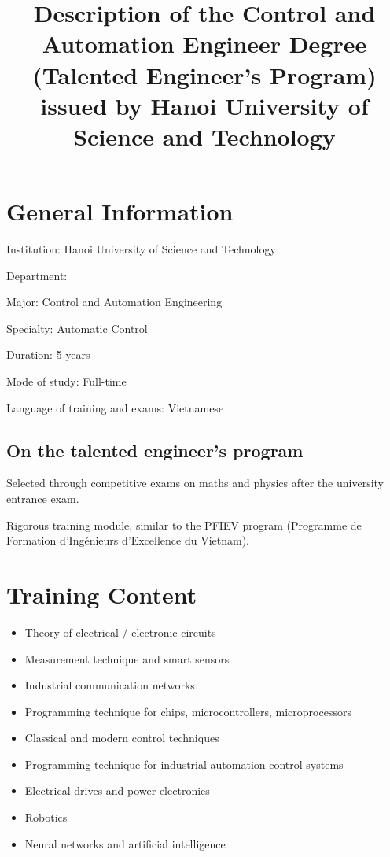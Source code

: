 \documentclass[11p]{article}
\title{Description of the Control and Automation Engineer Degree (Talented Engineer's Program)\\issued by Hanoi University of Science and Technology}
\author{}
\date{}
\theoremstyle{problemstyle}
\begin{document}
\maketitle

\section{General Information}

Institution: Hanoi University of Science and Technology

Department: 

Major: Control and Automation Engineering

Specialty: Automatic Control

Duration: 5 years

Mode of study: Full-time

Language of training and exams: Vietnamese

\subsection{On the talented engineer's program}

Selected through competitive exams on maths and physics after the university entrance exam.

Rigorous training module, similar to the PFIEV program (Programme de Formation d'Ingénieurs d'Excellence du Vietnam).

\section{Training Content}

\begin{itemize}
	\item Theory of electrical / electronic circuits
	\item Measurement technique and smart sensors
	\item Industrial communication networks
	\item Programming technique for chips, microcontrollers, microprocessors
	\item Classical and modern control techniques
	\item Programming technique for industrial automation control systems
	\item Electrical drives and power electronics
	\item Robotics
	\item Neural networks and artificial intelligence
\end{itemize}
\end{document}
